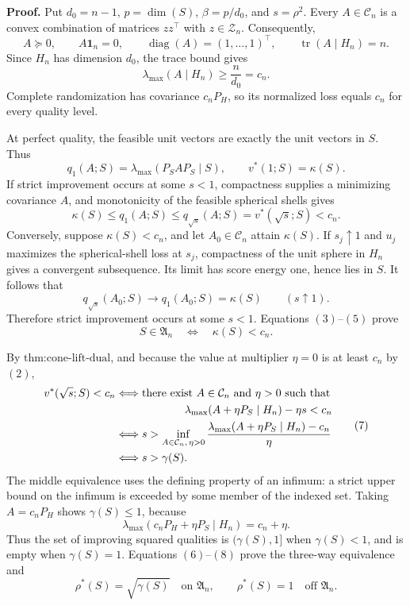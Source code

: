 \textbf{Proof.}
Put \(d_0=n-1\), \(p=\dim(S)\), \(\beta=p/d_0\), and \(s=\rho^2\). Every \(A\in\mathcal C_n\) is a convex combination of matrices \(zz^\top\) with \(z\in\mathcal Z_n\). Consequently,
\[
A\succeq0,
\qquad
A\mathbf 1_n=0,
\qquad
\operatorname{diag}(A)=(1,\ldots,1)^\top,
\qquad
\operatorname{tr}(A\mid H_n)=n.
\tag{1}
\]
Since \(H_n\) has dimension \(d_0\), the trace bound gives
\[
\lambda_{\max}(A\mid H_n)\geq \frac{n}{d_0}=c_n.
\tag{2}
\]
Complete randomization has covariance \(c_nP_H\), so its normalized loss equals \(c_n\) for every quality level.

At perfect quality, the feasible unit vectors are exactly the unit vectors in \(S\). Thus
\[
q_1(A;S)=\lambda_{\max}(P_SAP_S\mid S),
\qquad
v^*(1;S)=\kappa(S).
\tag{3}
\]
If strict improvement occurs at some \(s<1\), compactness supplies a minimizing covariance \(A\), and monotonicity of the feasible spherical shells gives
\[
\kappa(S)\leq q_1(A;S)\leq q_{\sqrt{s}}(A;S)=v^*(\sqrt{s};S)<c_n.
\tag{4}
\]
Conversely, suppose \(\kappa(S)<c_n\), and let \(A_0\in\mathcal C_n\) attain \(\kappa(S)\). If \(s_j\uparrow1\) and \(u_j\) maximizes the spherical-shell loss at \(s_j\), compactness of the unit sphere in \(H_n\) gives a convergent subsequence. Its limit has score energy one, hence lies in \(S\). It follows that
\[
q_{\sqrt{s}}(A_0;S)\longrightarrow q_1(A_0;S)=\kappa(S)
\qquad(s\uparrow1).
\tag{5}
\]
Therefore strict improvement occurs at some \(s<1\). Equations \((3)\)--\((5)\) prove
\[
S\in\mathfrak A_n
\quad\Longleftrightarrow\quad
\kappa(S)<c_n.
\tag{6}
\]

By \(\text{thm:cone-lift-dual}\), and because the value at multiplier \(\eta=0\) is at least \(c_n\) by \((2)\),
\[
\begin{aligned}
v^*(\sqrt{s};S)<c_n
&\Longleftrightarrow
\text{there exist }A\in\mathcal C_n\text{ and }\eta>0\text{ such that}\\
&\hspace{2.2cm}
\lambda_{\max}(A+\eta P_S\mid H_n)-\eta s<c_n\\
&\Longleftrightarrow
s>\inf_{A\in\mathcal C_n,\,\eta>0}
\frac{\lambda_{\max}(A+\eta P_S\mid H_n)-c_n}{\eta}\\
&\Longleftrightarrow s>\gamma(S).
\end{aligned}
\tag{7}
\]
The middle equivalence uses the defining property of an infimum: a strict upper bound on the infimum is exceeded by some member of the indexed set. Taking \(A=c_nP_H\) shows \(\gamma(S)\leq1\), because
\[
\lambda_{\max}(c_nP_H+\eta P_S\mid H_n)=c_n+\eta.
\tag{8}
\]
Thus the set of improving squared qualities is \((\gamma(S),1]\) when \(\gamma(S)<1\), and is empty when \(\gamma(S)=1\). Equations \((6)\)--\((8)\) prove the three-way equivalence and
\[
\rho^*(S)=\sqrt{\gamma(S)}
\quad\text{on }\mathfrak A_n,
\qquad
\rho^*(S)=1
\quad\text{off }\mathfrak A_n.
\tag{9}
\]


